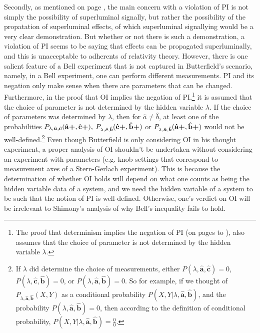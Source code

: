 {Secondly, as mentioned on page \pageref{lambdaknowledge}, the main concern with a violation of PI is not simply the possibility of superluminal signally, but rather the possibility of the propatation of superluminal effects, of which superluminal signallying would be a very clear demonstration. But whether or not there is such a demonstration, a violation of PI seems to be saying that effects can be propagated superluminally, and this is unacceptable to adherents of relativity theory.} However, there is one salient feature of a Bell experiment that is not captured in Butterfield's scenario, namely, in a Bell experiment, one can perform different measurements.  PI and its negation only make sense when there are parameters that can be changed. Furthermore, in the proof that OI implies the negation of PI,\footnote{The proof  that determinism implies the negation of PI (on pages \pageref{bellinequality2} to \pageref{PIdeterminism}), also assumes that the choice of parameter is not determined by the hidden variable $\lambda$.} it is assumed that the choice of parameter is not determined by the hidden variable $\lambda$. If the choice of parameters was determined by $\lambda$, then for $\hat{a}\neq\hat{b}$, at least one of the probabilities $P_{\lambda,\bm{\hat{a}},\bm{\hat{c}}}(\vb{\hat{{a}}}\bm{+},\vb{\hat{{c}}}\bm{+}),$ $P_{\lambda,\bm{\hat{c}},\bm{\hat{b}}}(\vb{\hat{{c}}}\bm{+},\vb{\hat{{b}}}\bm{+})$ or $P_{\lambda,\bm{\hat{a}},\bm{\hat{b}}}(\vb{\hat{{a}}}\bm{+},\vb{\hat{{b}}}\bm{+})$ would not be well-defined.\footnote{If $\lambda$ \label{lambdadetermineprob} did determine the choice of measurements, either $P(\lambda,\bm{\hat{a}},\bm{\hat{c}})=0$, $P(\lambda,\bm{\hat{c}},\bm{\hat{b}})=0$, or $P(\lambda,\bm{\hat{a}},\bm{\hat{b}})=0$. So for example, if we thought of $P_{\lambda,\bm{\hat{a}},\bm{\hat{b}}}(X,Y)$ as a conditional probability $P(X,Y|\lambda,\bm{\hat{a}},\bm{\hat{b}})$, and the probability $P(\lambda,\bm{\hat{a}},\bm{\hat{b}})=0$, then according to the definition of conditional probability,  $P(X,Y|\lambda,\bm{\hat{a}},\bm{\hat{b}})=\frac{0}{0}.$} Even though Butterfield is only considering OI in his thought experiment, a proper analysis of OI shouldn't be undertaken without considering an experiment with parameters (e.g. knob settings that correspond to measurement axes of a Stern-Gerlach experiment). This is because the determination of whether OI holds will depend on what one counts as being the hidden variable data of a system, and we need the hidden variable of a system to be such that the notion of PI is well-defined. Otherwise, one's verdict on OI will be irrelevant to Shimony's analysis of why Bell's inequality fails to hold. 

